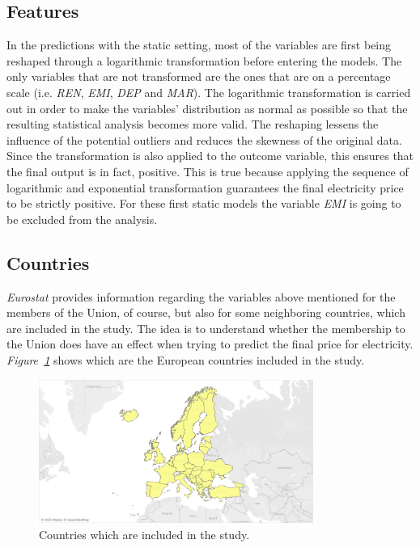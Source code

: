 \documentclass[a4paper,12pt]{book}
\begin{document}
\subsection{Features}

In the predictions with the static setting, most of the variables are first being reshaped through a logarithmic transformation before entering the models. The only variables that are not transformed are the ones that are on a percentage scale (i.e. \textit{REN}, \textit{EMI}, \textit{DEP} and \textit{MAR}). The logarithmic transformation is carried out in order to make the variables' distribution as normal as possible so that the resulting statistical analysis becomes more valid. The reshaping lessens the influence of the potential outliers and reduces the skewness of the original data. Since the transformation is also applied to the outcome variable, this ensures that the final output is in fact, positive. This is true because applying the sequence of logarithmic and exponential transformation guarantees the final electricity price to be strictly positive. For these first static models the variable \textit{EMI} is going to be excluded from the analysis.

\subsection{Countries}

\textit{Eurostat} provides information regarding the variables above mentioned for the members of the Union, of course, but also for some neighboring countries, which are included in the study. The idea is to understand whether the membership to the Union does have an effect when trying to predict the final price for electricity. \textit{Figure~\ref{fig:cantries}} shows which are the European countries included in the study.

\begin{figure}[tb]
\begin{center}
\captionsetup{justification=centering}
\includegraphics[width=0.8\textwidth]{Images/cantries.png}
\caption{Countries which are included in the study.}
\label{fig:cantries}
\end{center}
\end{figure}
\end{document}
